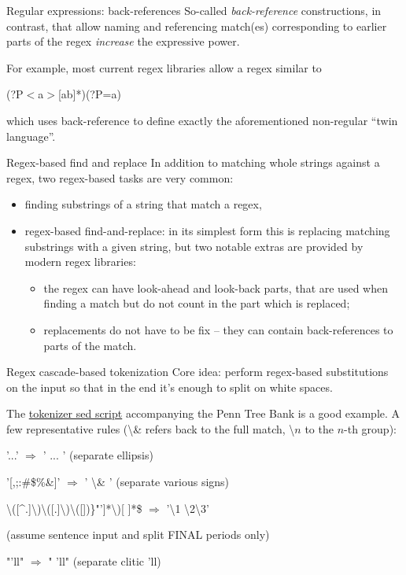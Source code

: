 \documentclass[style=upen, size=14pt]{powerdot}
\newcommand{\gold}{\color{arany}}
\theoremstyle{definition}
\begin{document}
\begin{slide}[toc=]{Regular expressions: back-references}
  So-called \emph{\gold back-reference} constructions, in contrast, that allow
  naming and referencing match(es) corresponding to earlier parts of the regex
  \emph{increase} the expressive power.\bigskip

  For example, most current regex libraries allow a regex similar to\bigskip

  (?P$<$a$>$[ab]*)(?P=a)\bigskip

  which uses back-reference to define exactly the aforementioned non-regular
  ``twin language''.
\end{slide}

\begin{slide}[toc=]{Regex-based find and replace}
  In addition to matching whole strings against a regex, two regex-based tasks are
  very common:
  \begin{itemize}
  \item finding substrings of a string that match a regex,
  \item regex-based find-and-replace: in its simplest form this is replacing
    matching substrings with a given string, but two notable
    extras are provided by modern regex libraries:
    \begin{itemize}
    \item the regex can have look-ahead and look-back parts, that are used when
      finding a match but do not count in the part which is replaced;
    \item replacements do not have to be fix -- they can contain back-references
      to parts of the match.
    \end{itemize}
  \end{itemize}
\end{slide}

\begin{slide}[toc=Regex cascade]{Regex cascade-based tokenization}
  Core idea: perform regex-based substitutions on the input so that in the end
  it's enough to split on white spaces.\bigskip

  The
  \href{ftp://ftp.cis.upenn.edu/pub/treebank/public_html/tokenizer.sed}{tokenizer
    sed script} accompanying the Penn Tree Bank is a good example. A few
  representative rules (\textbackslash \& refers back to the full match,
  \textbackslash $n$ to the $n$-th group):\bigskip

  '...' $\Rightarrow$ ' ... ' (separate ellipsis)
  
  '[,;:\#\$\%\&]' $\Rightarrow$ ' \textbackslash \& ' (separate various signs)

  
  \textbackslash([\^{}.]\textbackslash)\textbackslash([.]\textbackslash)\textbackslash([])\}"']*\textbackslash)[   ]*\$ $\Rightarrow$ '\textbackslash 1 \textbackslash 2\textbackslash 3'

  (assume sentence input and split FINAL periods only)

  "'ll" $\Rightarrow$ " 'll" (separate clitic 'll)
\end{slide}
\end{document}
